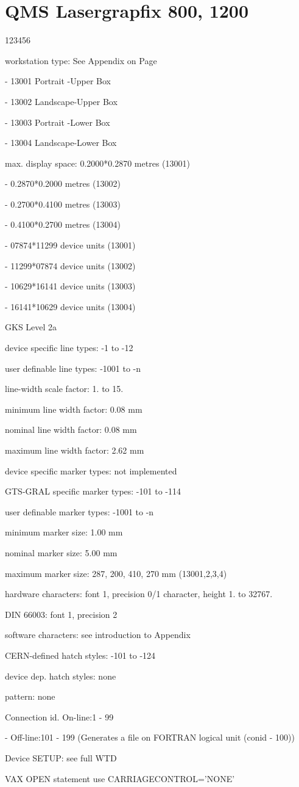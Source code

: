 \section{QMS Lasergrapfix 800, 1200}
\begin{DLtt}{123456}
\item[workstation type:]See Appendix on Page~\pageref{sec:gtstyp}
\item[-]13001 Portrait -Upper Box
\item[-]13002 Landscape-Upper Box
\item[-]13003 Portrait -Lower Box
\item[-]13004 Landscape-Lower Box
\item[max. display space:]0.2000*0.2870 metres (13001)
\item[-]0.2870*0.2000 metres (13002)
\item[-]0.2700*0.4100 metres (13003)
\item[-]0.4100*0.2700 metres (13004)
\item[-]07874*11299 device units (13001)
\item[-]11299*07874 device units (13002)
\item[-]10629*16141 device units (13003)
\item[-]16141*10629 device units (13004)
\item[GKS Level]2a
\item[device specific line types:]-1 to -12
\item[user definable line types:]-1001 to -n
\item[line-width scale factor:]1. to 15.
\item[minimum line width factor:]0.08 mm
\item[nominal line width factor:]0.08 mm
\item[maximum line width factor:]2.62 mm
\item[device specific marker types:]not implemented
\item[GTS-GRAL specific marker types:]-101 to -114
\item[user definable marker types:]-1001 to -n
\item[minimum marker size:]1.00 mm
\item[nominal marker size:]5.00 mm
\item[maximum marker size:]287, 200, 410, 270 mm (13001,2,3,4)
\item[hardware characters:]font 1, precision 0/1 character, height 1. to 32767.
\item[DIN 66003:]font 1, precision 2
\item[software characters:]see introduction to Appendix
\item[CERN-defined hatch styles:]-101 to -124
\item[device dep. hatch styles:]none
\item[pattern:]none
\item[Connection id.]On-line:1 - 99
\item[-]Off-line:101 - 199 (Generates a file on FORTRAN logical unit
(conid - 100))
\item[Device SETUP:]see full WTD
\item[VAX OPEN statement]use CARRIAGECONTROL='NONE'
\end{DLtt}
